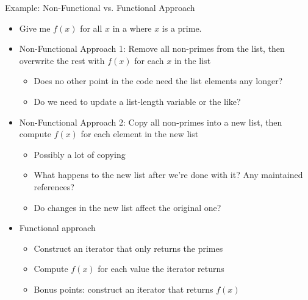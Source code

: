 \begin{frame}{Example: Non-Functional vs. Functional Approach}
%
\begin{itemize}
\item Give me $f(x)$ for all $x$ in a  where $x$ is a prime.
\item Non-Functional Approach 1: Remove all non-primes from the list, then overwrite the rest with $f(x)$ for each $x$ in the list
	\begin{itemize}
	\item Does no other point in the code need the list elements any longer?
	\item Do we need to update a list-length variable or the like?
	\end{itemize}
\item Non-Functional Approach 2: Copy all non-primes into a new list, then compute $f(x)$ for each element in the new list
	\begin{itemize}
	\item Possibly a lot of copying
	\item What happens to the new list after we're done with it? Any maintained references?
	\item Do changes in the new list affect the original one?
	\end{itemize}
\item Functional approach
	\begin{itemize}
	\item Construct an iterator that only returns the primes
	\item Compute $f(x)$ for each value the iterator returns
	\item Bonus points: construct an iterator that returns $f(x)$
	\end{itemize}
\end{itemize}
%
\end{frame}


